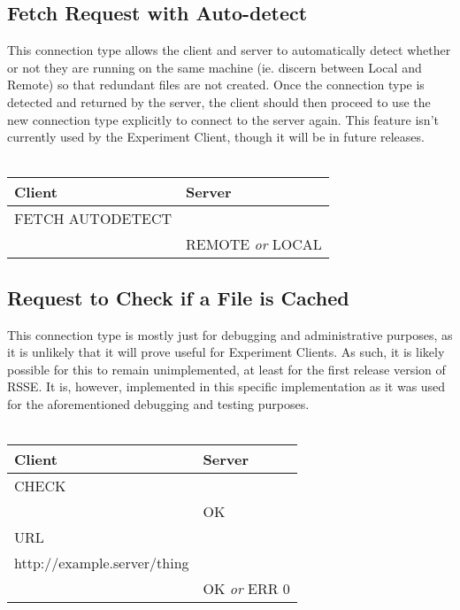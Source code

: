 \documentclass[letterpaper]{article}
\begin{document}
\subsection{Fetch Request with Auto-detect}
This connection type allows the client and server to automatically detect whether or not they are running on the same machine (ie. discern between Local and Remote) so that redundant files are not created. Once the connection type is detected and returned by the server, the client should then proceed to use the new connection type explicitly to connect to the server again. This feature isn't currently used by the Experiment Client, though it will be in future releases. 
\\
\\
\begin{tabular}{|l|l|}
\hline
\textbf{Client} & \textbf{Server}\\
\hline
\hline
FETCH AUTODETECT &\\
\hline
& REMOTE \textit{or} LOCAL\\
\hline
\end{tabular}

\subsection{Request to Check if a File is Cached}
This connection type is mostly just for debugging and administrative purposes, as it is unlikely that it will prove useful for Experiment Clients. As such, it is likely possible for this to remain unimplemented, at least for the first release version of RSSE. It is, however, implemented in this specific implementation as it was used for the aforementioned debugging and testing purposes. 
\\
\\
\begin{tabular}{|l|l|}
\hline
\textbf{Client} & \textbf{Server}\\
\hline
\hline
CHECK &\\
\hline
& OK\\
\hline
URL & \\
http://example.server/thing & \\
\hline
& OK \textit{or} ERR 0\\
\hline
\end{tabular}
\end{document}
